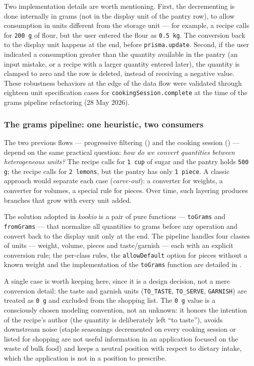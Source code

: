 Two implementation details are worth mentioning. First, the decrementing is done internally in grams (not in the display unit of the pantry row), to allow consumption in units different from the storage unit --- for example, a recipe calls for \texttt{200 g} of flour, but the user entered the flour as \texttt{0.5 kg}. The conversion back to the display unit happens at the end, before \texttt{prisma.update}. Second, if the user indicated a consumption greater than the quantity available in the pantry (an input mistake, or a recipe with a larger quantity entered later), the quantity is clamped to zero and the row is deleted, instead of receiving a negative value. These robustness behaviors at the edge of the data flow were validated through eighteen unit specification cases for \texttt{cookingSession.complete} at the time of the grams pipeline refactoring (28 May 2026).

\subsubsection{The grams pipeline: one heuristic, two consumers}\label{subsec:algoritm-grame}

The two previous flows --- progressive filtering () and the cooking session () --- depend on the same practical question: \textit{how do we convert quantities between heterogeneous units?} The recipe calls for \texttt{1 cup} of sugar and the pantry holds \texttt{500 g}; the recipe calls for \texttt{2 lemons}, but the pantry has only \texttt{1 piece}. A classic approach would separate each case (\textit{carve-out}): a converter for weights, a converter for volumes, a special rule for pieces. Over time, such layering produces branches that grow with every unit added.

The solution adopted in \textit{\gls{kookio}} is a pair of pure functions --- \texttt{toGrams} and \texttt{fromGrams} --- that normalize all quantities to grams before any operation and convert back to the display unit only at the end. The pipeline handles four classes of units --- weight, volume, pieces and taste/garnish --- each with an explicit conversion rule; the per-class rules, the \texttt{allowDefault} option for pieces without a known weight and the implementation of the \texttt{toGrams} function are detailed in .

A single case is worth keeping here, since it is a design decision, not a mere conversion detail: the taste and garnish units (\texttt{TO\_TASTE}, \texttt{TO\_SERVE}, \texttt{GARNISH}) are treated as \texttt{0 g} and excluded from the shopping list. The \texttt{0 g} value is a consciously chosen modeling convention, not an unknown: it honors the intention of the recipe's author (the quantity is deliberately left “to taste”), avoids downstream noise (staple seasonings decremented on every cooking session or listed for shopping are not useful information in an application focused on the waste of bulk food) and keeps a neutral position with respect to dietary intake, which the application is not in a position to prescribe.

